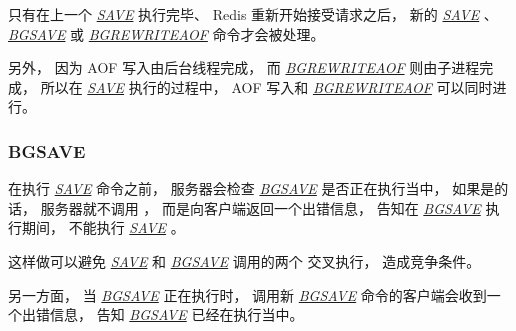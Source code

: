 \documentclass[a4paper,11pt,english]{sphinxmanual}
\begin{document}
只有在上一个 \href{http://redis.readthedocs.org/en/latest/server/save.html\#save}{\emph{SAVE}} 执行完毕、
Redis 重新开始接受请求之后，
新的 \href{http://redis.readthedocs.org/en/latest/server/save.html\#save}{\emph{SAVE}} 、 \href{http://redis.readthedocs.org/en/latest/server/bgsave.html\#bgsave}{\emph{BGSAVE}} 或 \href{http://redis.readthedocs.org/en/latest/server/bgrewriteaof.html\#bgrewriteaof}{\emph{BGREWRITEAOF}} 命令才会被处理。

另外，
因为 AOF 写入由后台线程完成，
而 \href{http://redis.readthedocs.org/en/latest/server/bgrewriteaof.html\#bgrewriteaof}{\emph{BGREWRITEAOF}} 则由子进程完成，
所以在 \href{http://redis.readthedocs.org/en/latest/server/save.html\#save}{\emph{SAVE}} 执行的过程中，
AOF 写入和 \href{http://redis.readthedocs.org/en/latest/server/bgrewriteaof.html\#bgrewriteaof}{\emph{BGREWRITEAOF}} 可以同时进行。


\subsubsection{BGSAVE}
\label{internal/rdb:bgsave}
在执行 \href{http://redis.readthedocs.org/en/latest/server/save.html\#save}{\emph{SAVE}} 命令之前，
服务器会检查 \href{http://redis.readthedocs.org/en/latest/server/bgsave.html\#bgsave}{\emph{BGSAVE}} 是否正在执行当中，
如果是的话，
服务器就不调用  ，
而是向客户端返回一个出错信息，
告知在 \href{http://redis.readthedocs.org/en/latest/server/bgsave.html\#bgsave}{\emph{BGSAVE}} 执行期间，
不能执行 \href{http://redis.readthedocs.org/en/latest/server/save.html\#save}{\emph{SAVE}} 。

这样做可以避免 \href{http://redis.readthedocs.org/en/latest/server/save.html\#save}{\emph{SAVE}} 和 \href{http://redis.readthedocs.org/en/latest/server/bgsave.html\#bgsave}{\emph{BGSAVE}} 调用的两个  交叉执行，
造成竞争条件。

另一方面，
当 \href{http://redis.readthedocs.org/en/latest/server/bgsave.html\#bgsave}{\emph{BGSAVE}} 正在执行时，
调用新 \href{http://redis.readthedocs.org/en/latest/server/bgsave.html\#bgsave}{\emph{BGSAVE}} 命令的客户端会收到一个出错信息，
告知 \href{http://redis.readthedocs.org/en/latest/server/bgsave.html\#bgsave}{\emph{BGSAVE}} 已经在执行当中。
\end{document}
